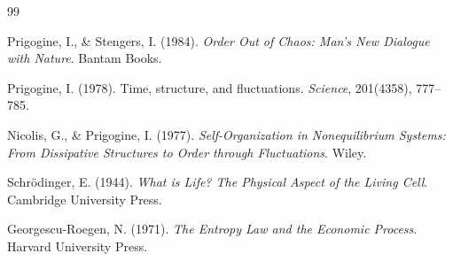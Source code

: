 \documentclass[11pt,a4paper]{ctexart}
\begin{document}
\vspace{1.5em}

\begin{thebibliography}{99}

Prigogine, I., \& Stengers, I. (1984). \textit{Order Out of Chaos: Man’s New Dialogue with Nature}. Bantam Books.

Prigogine, I. (1978). Time, structure, and fluctuations. \textit{Science}, 201(4358), 777--785.

Nicolis, G., \& Prigogine, I. (1977). \textit{Self-Organization in Nonequilibrium Systems: From Dissipative Structures to Order through Fluctuations}. Wiley.

Schr{\"o}dinger, E. (1944). \textit{What is Life? The Physical Aspect of the Living Cell}. Cambridge University Press.

Georgescu-Roegen, N. (1971). \textit{The Entropy Law and the Economic Process}. Harvard University Press.

\end{thebibliography}
\end{document}
